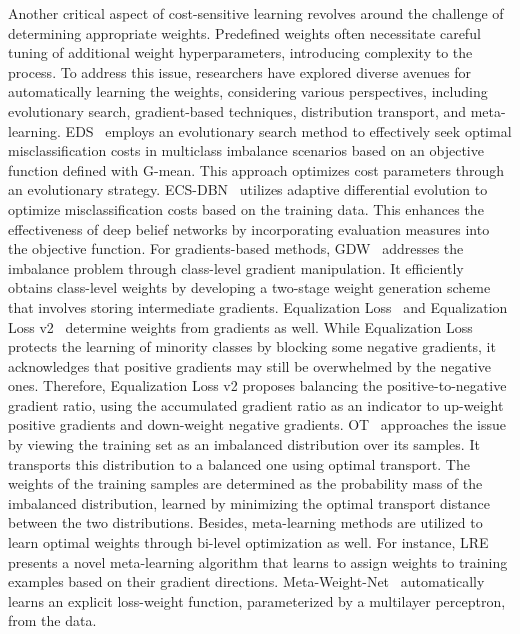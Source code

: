Another critical aspect of cost-sensitive learning revolves around the challenge of determining appropriate weights. Predefined weights often necessitate careful tuning of additional weight hyperparameters, introducing complexity to the process. To address this issue, researchers have explored diverse avenues for automatically learning the weights, considering various perspectives, including evolutionary search, gradient-based techniques, distribution transport, and meta-learning.
EDS~\cite{cao2013novel} employs an evolutionary search method to effectively seek optimal misclassification costs in multiclass imbalance scenarios based on an objective function defined with G-mean. This approach optimizes cost parameters through an evolutionary strategy.
ECS-DBN~\cite{zhang2018cost} utilizes adaptive differential evolution to optimize misclassification costs based on the training data. This enhances the effectiveness of deep belief networks by incorporating evaluation measures into the objective function.
For gradients-based methods, GDW~\cite{chen2021generalized} addresses the imbalance problem through class-level gradient manipulation. It efficiently obtains class-level weights by developing a two-stage weight generation scheme that involves storing intermediate gradients. 
Equalization Loss~\cite{tan2020equalization} and Equalization Loss v2~\cite{tan2021equalization} determine weights from gradients as well. While Equalization Loss protects the learning of minority classes by blocking some negative gradients, it acknowledges that positive gradients may still be overwhelmed by the negative ones. Therefore, Equalization Loss v2 proposes balancing the positive-to-negative gradient ratio, using the accumulated gradient ratio as an indicator to up-weight positive gradients and down-weight negative gradients.
OT~\cite{guo2022learning} approaches the issue by viewing the training set as an imbalanced distribution over its samples. It transports this distribution to a balanced one using optimal transport. The weights of the training samples are determined as the probability mass of the imbalanced distribution, learned by minimizing the optimal transport distance between the two distributions. 
Besides, meta-learning methods are utilized to learn optimal weights through bi-level optimization as well. For instance, LRE~\cite{ren2018learning} presents a novel meta-learning algorithm that learns to assign weights to training examples based on their gradient directions. Meta-Weight-Net~\cite{shu2019meta} automatically learns an explicit loss-weight function, parameterized by a multilayer perceptron, from the data.



